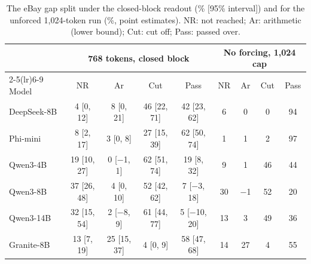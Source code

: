 \begin{table}[t]
\caption{The eBay gap split under the closed-block readout (\% [95\% interval]) and for the unforced 1,024-token run (\%, point estimates). NR: not reached; Ar: arithmetic (lower bound); Cut: cut off; Pass: passed over.}
\label{tab:splitebay2}
\footnotesize
\centering

\begin{tabular}{lcccc cccc}
\toprule
& \multicolumn{4}{c}{768 tokens, closed block} & \multicolumn{4}{c}{No forcing, 1,024 cap} \\ \cmidrule(lr){2-5}\cmidrule(lr){6-9} Model & NR & Ar & Cut & Pass & NR & Ar & Cut & Pass \\
\midrule
DeepSeek-8B & 4 [0, 12] & 8 [0, 21] & 46 [22, 71] & 42 [23, 62] & 6 & 0 & 0 & 94 \\
Phi-mini & 8 [2, 17] & 3 [0, 8] & 27 [15, 39] & 62 [50, 74] & 1 & 1 & 2 & 97 \\
Qwen3-4B & 19 [10, 27] & 0 [$-$1, 1] & 62 [51, 74] & 19 [8, 32] & 9 & 1 & 46 & 44 \\
Qwen3-8B & 37 [26, 48] & 4 [0, 10] & 52 [42, 62] & 7 [$-$3, 18] & 30 & $-$1 & 52 & 20 \\
Qwen3-14B & 32 [15, 54] & 2 [$-$8, 9] & 61 [44, 77] & 5 [$-$10, 20] & 13 & 3 & 49 & 36 \\
Granite-8B & 13 [7, 19] & 25 [15, 37] & 4 [0, 9] & 58 [47, 68] & 14 & 27 & 4 & 55 \\
\bottomrule
\end{tabular}
\end{table}
